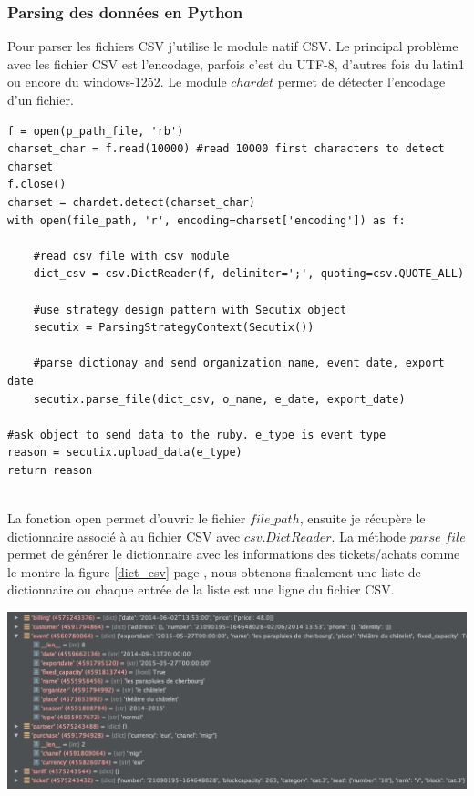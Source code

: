 \subsubsection{Parsing des données en Python}
Pour parser les fichiers CSV j'utilise le module natif CSV. Le principal problème avec les fichier CSV est l'encodage, parfois c'est du UTF-8, d'autres fois du latin1 ou encore du windows-1252. Le module $chardet$ permet de détecter l'encodage d'un fichier.
\\


\lstset{style=custompython}
\begin{lstlisting}
f = open(p_path_file, 'rb')
charset_char = f.read(10000) #read 10000 first characters to detect charset
f.close()
charset = chardet.detect(charset_char)
with open(file_path, 'r', encoding=charset['encoding']) as f:

	#read csv file with csv module
	dict_csv = csv.DictReader(f, delimiter=';', quoting=csv.QUOTE_ALL)
	
	#use strategy design pattern with Secutix object
	secutix = ParsingStrategyContext(Secutix())	
	
	#parse dictionay and send organization name, event date, export date
	secutix.parse_file(dict_csv, o_name, e_date, export_date)

#ask object to send data to the ruby. e_type is event type 
reason = secutix.upload_data(e_type)
return reason
\end{lstlisting}

\leavevmode \\
La fonction open permet d'ouvrir le fichier $file\_path$, ensuite je récupère le dictionnaire associé à au fichier CSV avec $csv.DictReader$. La méthode $parse\_file$ permet de générer le dictionnaire avec les informations des tickets/achats comme le montre la figure \ref{dict_csv} page \pageref{dict_csv}, nous obtenons finalement une liste de dictionnaire ou chaque entrée de la liste est une ligne du fichier CSV. 

\begin{center}
\includegraphics[scale=0.45]{Images/dict_tickets.png}
\label{dict_csv}
\end{center}

